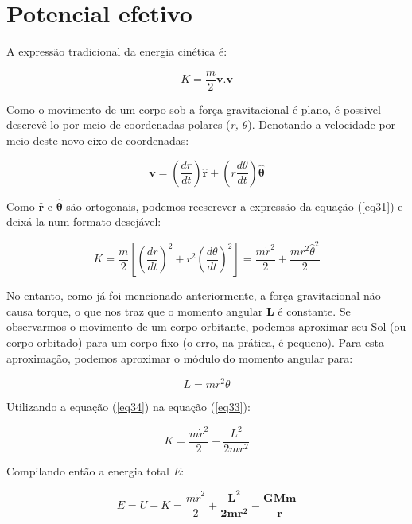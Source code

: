 \section{Potencial efetivo}

A expressão tradicional da energia cinética é:

\begin{equation}
    K = \frac{m}{2}\mathbf{v.v} \label{eq31}
\end{equation}

Como o movimento de um corpo sob a força gravitacional é plano, é possivel descrevê-lo por meio de coordenadas polares (\textit{r, $\theta$}). Denotando a velocidade por meio deste novo eixo de coordenadas:

\begin{equation}
   \mathbf{v} = \left(\frac{dr}{dt}\right)\mathbf{\hat{r}} + \left(r\frac{d\theta}{dt}\right)\mathbf{\hat{\theta}}
   \label{eq32}
\end{equation}

Como $\mathbf{\hat{r}}$ e $\mathbf{\hat{\theta}}$ são ortogonais, podemos reescrever a expressão da equação (\ref{eq31}) e deixá-la num formato desejável:

\begin{equation}
    K = \frac{m}{2}\left[\left(\frac{dr}{dt}\right)^2 + r^2\left(\frac{d\theta}{dt}\right)^2\right] = \frac{m\dot{r}^2}{2} + \frac{mr^2\hat{\theta}^2}{2}
    \label{eq33}
\end{equation}

No entanto, como já foi mencionado anteriormente, a força gravitacional não causa torque, o que nos traz que o momento angular \textbf{L} é constante. Se observarmos o movimento de um corpo orbitante, podemos aproximar seu Sol (ou corpo orbitado) para um corpo fixo (o erro, na prática, é pequeno). Para esta aproximação, podemos aproximar o módulo do momento angular para:

\begin{equation}
    L = mr^2\dot{\theta} \label{eq34}
\end{equation}

Utilizando a equação (\ref{eq34}) na equação (\ref{eq33}):

\begin{equation}
    K = \frac{m\dot{r}^2}{2} + \frac{L^2}{2mr^2} \label{eq35}
\end{equation}

Compilando então a energia total \textit{E}:

\begin{equation}
    E = U + K = \frac{m\dot{r}^2}{2} + \mathbf{\frac{L^2}{2mr^2} - \frac{GMm}{r}} \label{eq36}
\end{equation}

